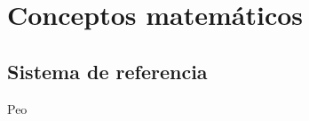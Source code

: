 \documentclass[../main_ej.tex]{subfiles}
\begin{document}
\chapter{Conceptos matemáticos}
\section{Sistema de referencia}
Peo
 
\end{document}
